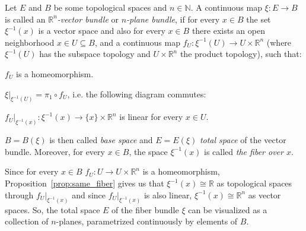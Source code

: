 \begin{definition}\label{def:vector_bundle} Let $E$ and $B$ be some topological spaces and $n\in\mathbb{N}$. A continuous map $\xi:E\to B$ is called an \emph{$\mathbb{R}^n$-vector bundle} or \emph{$n$-plane bundle}, if for every $x\in B$ the set $\xi^{-1}(x)$ is a vector space and also for every $x\in B$ there exists an open neighborhood $x\in U\subseteq B$, and a continuous map $f_U:\xi^{-1}(U)\to U\times\mathbb{R}^n$ (where $\xi^{-1}(U)$ has the subspace topology and $U\times\mathbb{R}^n$ the product topology), such that:
\begin{i_enum}
\item $f_U$ is a homeomorphism.
\item  $\xi|_{\xi^{-1}(U)}=\pi_1\circ f_U$, i.e. the following diagram commutes:
\begin{center}
\end{center}
\item $f_U|_{\xi^{-1}(x)}:\xi^{-1}(x)\to\{x\}\times\mathbb{R}^n$ is linear for every $x\in U$.
\end{i_enum}
$B=B(\xi)$ is then called \emph{base space} and $E=E(\xi)$ \emph{total space} of the vector bundle. Moreover, for every $x\in B$, the space $\xi^{-1}(x)$ is called \emph{the fiber over $x$}.
\end{definition}
\begin{remark} Since for every $x\in B$ $f_U:U\to U\times\mathbb{R}^n$ is a homeomorphism, Proposition~\ref{prop:same_fiber} gives us that $\xi^{-1}(x)\cong\mathbb{R}$ as topological spaces through $f_U|_{\xi^{-1}(x)}$ and since $f_U|_{\xi^{-1}(x)}$ is also linear, $\xi^{-1}(x)\cong\mathbb{R}^n$ as vector spaces. So, the total space $E$ of the fiber bundle $\xi$ can be visualized as a collection of $n$-planes, parametrized continuously by elements of $B$.
\end{remark}


